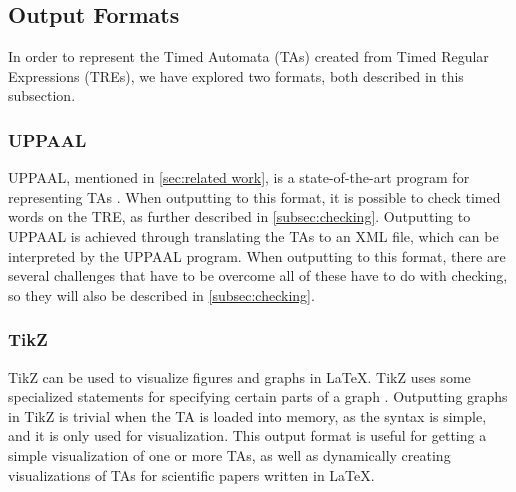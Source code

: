 \subsection{Output Formats}\label{subsec:formats}

In order to represent the Timed Automata (TAs) created from Timed Regular Expressions (TREs), we have explored two formats, both described in this subsection.

\subsubsection{UPPAAL}
UPPAAL, mentioned in \cref{sec:related work}, is a state-of-the-art program for representing TAs \cite{UPPAAL}.
When outputting to this format, it is possible to check timed words on the TRE, as further described in \cref{subsec:checking}.
Outputting to UPPAAL is achieved through translating the TAs to an XML file, which can be interpreted by the UPPAAL program.
When outputting to this format, there are several challenges that have to be overcome all of these have to do with checking, so they will also be described in \cref{subsec:checking}.

\subsubsection{TikZ}
TikZ can be used to visualize figures and graphs in LaTeX. TikZ uses some specialized statements for specifying certain parts of a graph \cite{Tikz}.
Outputting graphs in TikZ is trivial when the TA is loaded into memory, as the syntax is simple, and it is only used for visualization.
This output format is useful for getting a simple visualization of one or more TAs, as well as dynamically creating visualizations of TAs for scientific papers written in LaTeX.
